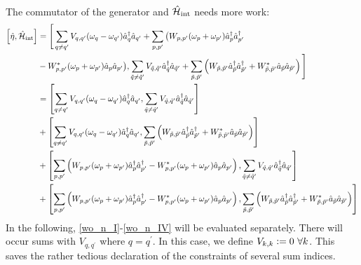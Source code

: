 \begin{appendix}
\begin{align}
\end{align}
The commutator of the generator and $\hat{\mathcal{H}}_{\mathrm{int}}$ needs more work:
\begin{align}
\left[\hat\eta,\hat{\mathcal{H}}_{\mathrm{int}}\right]&=\Bigg[\sum\limits_{q\neq q^\prime}V_{q,q^\prime}(\omega_q-\omega_{q^\prime})\hat a^\dagger_q\hat a_{q^\prime} +\sum\limits_{p,p^\prime}\big(W_{p,p^\prime}(\omega_p+\omega_{p^\prime})\hat a^\dagger_p\hat a^\dagger_{p^\prime}\\ \quad&-W_{p,p^\prime}^*(\omega_p+\omega_{p^\prime})\hat a_p\hat a_{p^\prime}\big),
\sum\limits_{\tilde q\neq \tilde q^\prime}V_{\tilde q,\tilde q^\prime}\hat a^\dagger_{\tilde q}\hat a_{\tilde q^\prime}+\sum\limits_{\tilde p,\tilde p^\prime}\left(W_{\tilde p,\tilde p^\prime}\hat a^\dagger_{\tilde p}\hat a^\dagger_{\tilde p^\prime}+W_{\tilde p,\tilde p^\prime}^*\hat a_{\tilde p}\hat a_{\tilde p^\prime}\right)\Bigg]\nonumber\\ \quad& 
=\left[\sum\limits_{q\neq q^\prime}V_{q,q^\prime}(\omega_q-\omega_{q^\prime})\hat a^\dagger_q\hat a_{q^\prime} , \sum\limits_{\tilde q\neq \tilde q^\prime}V_{\tilde q,\tilde q^\prime}\hat a^\dagger_{\tilde q}\hat a_{\tilde q^\prime} \right] \label{wo_n_I} \\ \quad&
+\left[\sum\limits_{q\neq q^\prime}V_{q,q^\prime}(\omega_q-\omega_{q^\prime})\hat a^\dagger_q\hat a_{q^\prime},\sum\limits_{\tilde p,\tilde p^\prime}\left(W_{\tilde p,\tilde p^\prime}\hat a^\dagger_{\tilde p}\hat a^\dagger_{\tilde p^\prime}+W_{\tilde p,\tilde p^\prime}^*\hat a_{\tilde p}\hat a_{\tilde p^\prime}\right)\right] \label{wo_n_II} \\ \quad&
+\left[\sum\limits_{p,p^\prime}\left(W_{p,p^\prime}(\omega_p+\omega_{p^\prime})\hat a^\dagger_p\hat a^\dagger_{p^\prime}-W_{p,p^\prime}^*(\omega_p+\omega_{p^\prime})\hat a_p\hat a_{p^\prime}\right),\sum\limits_{\tilde q\neq \tilde q^\prime}V_{\tilde q,\tilde q^\prime}\hat a^\dagger_{\tilde q}\hat a_{\tilde q^\prime}\right] \label{wo_n_III}\\ \quad&
+\left[\sum\limits_{p,p^\prime}\left(W_{p,p^\prime}(\omega_p+\omega_{p^\prime})\hat a^\dagger_p\hat a^\dagger_{p^\prime}-W_{p,p^\prime}^*(\omega_p+\omega_{p^\prime})\hat a_p\hat a_{p^\prime}\right),\sum\limits_{\tilde p,\tilde p^\prime}\left(W_{\tilde p,\tilde p^\prime}\hat a^\dagger_{\tilde p}\hat a^\dagger_{\tilde p^\prime}+W_{\tilde p,\tilde p^\prime}^*\hat a_{\tilde p}\hat a_{\tilde p^\prime}\right)\right] \label{wo_n_IV}
\end{align}
In the following, \ref{wo_n_I}-\ref{wo_n_IV} will be evaluated separately. There will occur sums with $V_{q,q^\prime}$ where $q=q^\prime$. In this case, we define $V_{k,k}\defeq 0\ \forall k$. This saves the rather tedious declaration of the constraints of several sum indices.
\begin{itemize}

\end{itemize}
\end{appendix}
